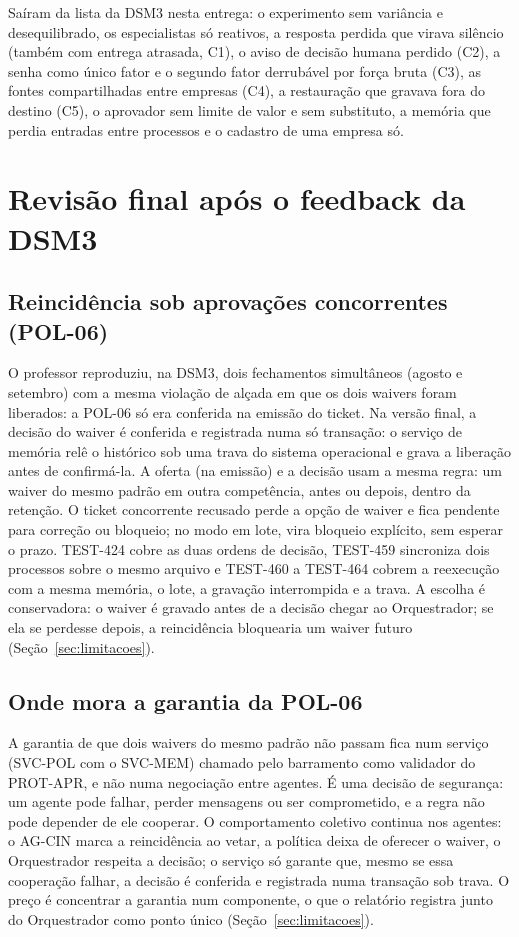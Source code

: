 \documentclass[10pt,a4paper]{article}
\begin{document}
Saíram da lista da DSM3 nesta entrega: o experimento sem variância e desequilibrado, os especialistas só reativos, a
resposta perdida que virava silêncio (também com entrega atrasada, C1), o aviso de decisão humana perdido (C2), a senha
como único fator e o segundo fator derrubável por força bruta (C3), as fontes compartilhadas entre empresas (C4), a
restauração que gravava fora do destino (C5), o aprovador sem limite de valor e sem substituto, a
memória que perdia entradas entre processos e o cadastro de uma empresa só.

\section{Revisão final após o feedback da DSM3}\label{sec:revisao-final}

\subsection{Reincidência sob aprovações concorrentes (POL-06)}
O professor reproduziu, na DSM3, dois fechamentos simultâneos (agosto e setembro) com a mesma violação de alçada em
que os dois waivers foram liberados: a POL-06 só era conferida na emissão do ticket. Na versão final, a decisão do
waiver é conferida e registrada numa só transação: o serviço de memória relê o histórico sob uma trava do sistema
operacional e grava a liberação antes de confirmá-la. A oferta (na emissão) e a decisão usam a mesma regra: um
waiver do mesmo padrão em outra competência, antes ou depois, dentro da retenção. O ticket concorrente recusado perde
a opção de waiver e fica pendente para correção ou bloqueio; no modo em lote, vira bloqueio explícito, sem esperar o
prazo. TEST-424 cobre as duas ordens de decisão, TEST-459 sincroniza dois processos sobre o mesmo arquivo e
TEST-460 a TEST-464 cobrem a reexecução com a mesma memória, o lote, a gravação interrompida e a trava. A escolha é
conservadora: o waiver é gravado antes de a decisão chegar ao Orquestrador; se ela se perdesse depois, a
reincidência bloquearia um waiver futuro (Seção~\ref{sec:limitacoes}).

\subsection{Onde mora a garantia da POL-06}
A garantia de que dois waivers do mesmo padrão não passam fica num serviço (SVC-POL com o SVC-MEM) chamado pelo
barramento como validador do PROT-APR, e não numa negociação entre agentes. É uma decisão de segurança: um agente pode
falhar, perder mensagens ou ser comprometido, e a regra não pode depender de ele cooperar. O comportamento coletivo
continua nos agentes: o AG-CIN marca a reincidência ao vetar, a política deixa de oferecer o waiver, o Orquestrador
respeita a decisão; o serviço só garante que, mesmo se essa cooperação falhar, a decisão é conferida e registrada numa
transação sob trava. O preço é concentrar a garantia num componente, o que o relatório registra junto do Orquestrador
como ponto único (Seção~\ref{sec:limitacoes}).
\end{document}
